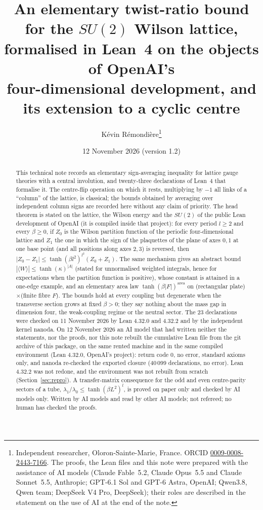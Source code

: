 \documentclass[11pt,a4paper]{article}
\title{An elementary twist-ratio bound for the $SU(2)$ Wilson lattice,\\ formalised in Lean~4 on the objects of OpenAI's\\ four-dimensional development, and its extension to a cyclic centre}
\author{K\'evin R\'emondi\`ere\thanks{Independent researcher, Oloron-Sainte-Marie, France. ORCID
\href{https://orcid.org/0009-0008-2443-7166}{0009-0008-2443-7166}. The proofs, the Lean files and this note were
prepared with the assistance of AI models (Claude Fable~5.2, Claude Opus~5.5 and Claude Sonnet~5.5, Anthropic; GPT-6.1 Sol and GPT-6 Astra, OpenAI; Qwen3.8, Qwen team; DeepSeek V4 Pro, DeepSeek); their roles are described in the
statement on the use of AI at the end of the note.}}
\date{12 November 2026 (version 1.2)}
\theoremstyle{plain}
\theoremstyle{definition}
\theoremstyle{remark}
\numberwithin{equation}{section}
\begin{document}
\maketitle

\begin{abstract}
This technical note records an elementary sign-averaging inequality for lattice gauge theories with a central involution, and twenty-three declarations of Lean~4 that formalise it. The centre-flip operation on which it rests, multiplying by $-1$ all links of a ``column'' of the lattice, is classical; the bounds obtained by averaging over independent column signs are recorded here without any claim of priority. The head theorem is stated on the lattice, the Wilson energy and the $SU(2)$ of the public Lean development of OpenAI (it is compiled inside that project): for every period $l\ge2$ and every $\beta\ge0$, if $Z_0$ is the Wilson partition function of the periodic four-dimensional lattice and $Z_1$ the one in which the sign of the plaquettes of the plane of axes $0,1$ at one base point (and all positions along axes $2,3$) is reversed, then $|Z_0-Z_1|\le\tanh(\beta l^2)^{l^2}(Z_0+Z_1)$. The same mechanism gives an abstract bound $|\langle W\rangle|\le\tanh(\kappa)^{|A|}$ (stated for unnormalised weighted integrals, hence for expectations when the partition function is positive), whose constant is attained in a one-edge example, and an elementary area law $\tanh(\beta|F|)^{\mathrm{area}}$ on (rectangular plate)$\times$(finite fibre $F$). The bounds hold at every coupling but degenerate when the transverse section grows at fixed $\beta>0$; they say nothing about the mass gap in dimension four, the weak-coupling regime or the neutral sector. The 23 declarations were checked on 11 November 2026 by Lean 4.32.0 and 4.32.2 and by the independent kernel nanoda. On 12 November 2026 an AI model that had written neither the statements, nor the proofs, nor this note rebuilt the cumulative Lean file from the git archive of this package, on the same rented machine and in the same compiled environment (Lean 4.32.0, OpenAI's project): return code 0, no error, standard axioms only, and nanoda re-checked the exported closure (40\,099 declarations, no error). Lean 4.32.2 was not redone, and the environment was not rebuilt from scratch (Section~\ref{sec:repro}). A transfer-matrix consequence for the odd and even centre-parity sectors of a tube, $\lambda_1/\lambda_0\le\tanh(\beta L^2)^l$, is proved on paper only and checked by AI models only. Written by AI models and read by other AI models; not refereed; no human has checked the proofs.


\end{abstract}
\end{document}
